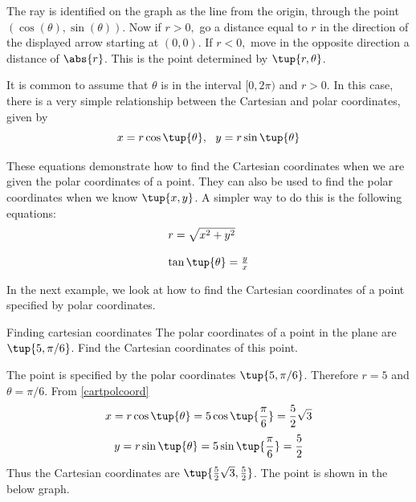 The ray is identified on the graph as the line from the origin, through the point $(\cos(\theta),\sin(\theta))$. Now if $r>0,$ go a distance
equal to $r$ in the direction of the displayed arrow starting at $(0,0)$. If 
$r<0,$ move in the opposite direction a distance of $\abs{r}
$. This is the point determined by $\tup{r,\theta }$.

It is common to assume that $\theta $ is in the interval $
[0,2\pi )$ and $r>0.$ In this case, there is a very simple relationship
between the Cartesian and polar coordinates, given by
\begin{equation}
x=r\cos \tup{\theta } ,\ \ y=r\sin \tup{\theta } 
\label{cartpolcoord}
\end{equation}

These equations demonstrate how to find the Cartesian coordinates when we are given the polar coordinates of a point. They can also be used to find the polar coordinates when we know $\tup{x, y }$. A simpler way to do this is the following equations:
\begin{equation}
\begin{array}{l}
r = \sqrt{x^2 + y^2} \\
\\
\tan \tup{\theta} = \frac{y}{x}
\end{array}
\label{polcartcoord}
\end{equation}

In the next example, we look at how to find the Cartesian coordinates of a point specified by polar coordinates. 

\begin{example}{Finding cartesian coordinates}{}
The polar coordinates of a point in the plane are $\tup{5,\pi /6} $.
Find the Cartesian coordinates of this point.
\end{example}

\begin{solution}
The point is specified by the polar coordinates $\tup{5,\pi /6}$. Therefore $r=5$ and $\theta = \pi /6$. 
From \ref{cartpolcoord}
\[
x= r \cos \tup{\theta }= 5\cos \tup{\vspace{0.05in}\frac{\pi }{6}} = \vspace{0.05in}\frac{5}{2}\sqrt{3}
\]
\[
y= r \sin \tup{\theta } = 5\sin \tup{\vspace{0.05in}\frac{\pi }{6}} = \vspace{0.05in}\frac{5}{2}
\]
Thus the Cartesian coordinates are $\tup{\vspace{0.05in}\frac{5}{2}\sqrt{3}, \vspace{0.05in}\frac{5}{2}}$. The point is shown in the below graph. 

\begin{center}
\end{center}
\end{solution}

